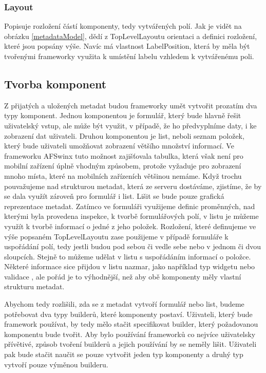 \subsubsection{Layout}
Popisuje rozložení částí komponenty, tedy vytvářených polí. Jak je vidět na obrázku \ref{metadataModel}, dědí z TopLevelLayoutu orientaci a definici rozložení, které jsou popsány výše. Navíc má vlastnost LabelPosition, která by měla být tvořenými frameworky využita k umístění labelu vzhledem k vytvářenému poli.

\subsection{Tvorba komponent}
Z přijatých a uložených metadat budou frameworky umět vytvořit prozatím dva typy komponent. Jednou komponentou je formulář, který bude hlavně řešit uživatelský vstup, ale může být využit, v případě, že ho předvyplníme daty, i ke zobrazení dat uživateli. Druhou komponentou je list, neboli seznam položek, který bude uživateli umožňovat zobrazení většího množství informací. Ve frameworku AFSwinx tuto možnost zajišťovala tabulka, která však není pro mobilní zařízení úplně vhodným způsobem, protože vyžaduje pro zobrazení mnoho místa, které na mobilních zařízeních většinou nemáme.
Když trochu pouvažujeme nad strukturou metadat, která ze serveru dostáváme, zjistíme, že by se dala využít zároveň pro formulář i list. Lišit se bude pouze grafická reprezentace metadat. Zatímco ve formuláři využijeme definic proměnných, nad kterými byla provedena inspekce, k tvorbě formulářových polí, v listu je můžeme využít k tvorbě informací o jedné z jeho položek. Rozložení, které definujeme ve výše popsaném TopLevelLayoutu zase použijeme v případě formuláře k uspořádání polí, tedy jestli budou pod sebou či vedle sebe nebo v jednom či dvou sloupcích. Stejně to můžeme udělat v listu s uspořádáním informací o položce. Některé informace sice přijdou v listu nazmar, jako například typ widgetu nebo validace , ale pořád je to výhodnější, než aby obě komponenty měly vlastní strukturu metadat. 

Abychom tedy rozlišili, zda se z metadat vytvoří formulář nebo list, budeme potřebovat dva typy builderů, které komponenty postaví. Uživateli, který bude framework používat, by tedy mělo stačit specifikovat builder, který požadovanou komponentu bude tvořit. Aby bylo používání frameworků co nejvíce uživatelsky přívětivé, způsob tvoření builderů a jejich používání by se neměly lišit. Uživateli pak bude stačit naučit se pouze vytvořit jeden typ komponenty a druhý typ vytvoří pouze výměnou builderu. 

